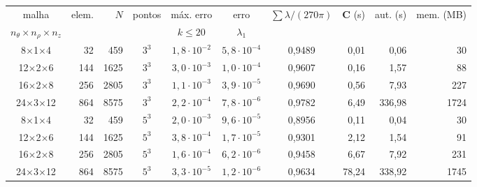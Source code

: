 \begin{tabular}{c r r c c c c r r r}
\toprule
malha & elem. & $N$ & pontos & máx. erro & erro & $\sum\lambda/(270\pi)$ & $\mathbf{C}$ (s) & aut. (s) & mem. (MB) \\
$n_\theta\times n_\rho\times n_z$ & & & & $k \le 20$ & $\lambda_1$ & & & & \\
\midrule
8$\times$1$\times$4 & 32 & 459 & $3^3$ & $1{,}8\cdot10^{-2}$ & $5{,}8\cdot10^{-4}$ & 0,9489 & 0,01 & 0,06 & 30 \\
12$\times$2$\times$6 & 144 & 1625 & $3^3$ & $3{,}0\cdot10^{-3}$ & $1{,}0\cdot10^{-4}$ & 0,9607 & 0,16 & 1,57 & 88 \\
16$\times$2$\times$8 & 256 & 2805 & $3^3$ & $1{,}1\cdot10^{-3}$ & $3{,}9\cdot10^{-5}$ & 0,9690 & 0,56 & 7,93 & 227 \\
24$\times$3$\times$12 & 864 & 8575 & $3^3$ & $2{,}2\cdot10^{-4}$ & $7{,}8\cdot10^{-6}$ & 0,9782 & 6,49 & 336,98 & 1724 \\
\midrule
8$\times$1$\times$4 & 32 & 459 & $5^3$ & $2{,}0\cdot10^{-3}$ & $9{,}6\cdot10^{-5}$ & 0,8956 & 0,11 & 0,04 & 30 \\
12$\times$2$\times$6 & 144 & 1625 & $5^3$ & $3{,}8\cdot10^{-4}$ & $1{,}7\cdot10^{-5}$ & 0,9301 & 2,12 & 1,54 & 91 \\
16$\times$2$\times$8 & 256 & 2805 & $5^3$ & $1{,}6\cdot10^{-4}$ & $6{,}2\cdot10^{-6}$ & 0,9458 & 6,67 & 7,92 & 231 \\
24$\times$3$\times$12 & 864 & 8575 & $5^3$ & $3{,}3\cdot10^{-5}$ & $1{,}2\cdot10^{-6}$ & 0,9634 & 78,24 & 338,92 & 1745 \\
\bottomrule
\end{tabular}
